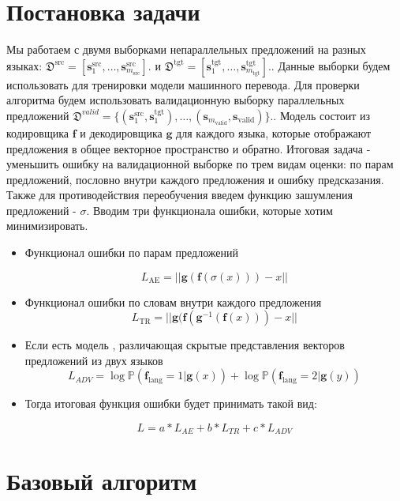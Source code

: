 \documentclass{article}
\begin{document}
\section{Постановка задачи}
Мы работаем с двумя выборками непараллельных предложений на разных языках: $\mathfrak{D}^{\text{src}} = [\mathbf{s}_1^{\text{src}},\dots,\mathbf{s}_{m_\text{src}}^{\text{src}}].$ и $\mathfrak{D}^{\text{tgt}} = [\mathbf{s}_1^{\text{tgt}}, \dots, \mathbf{s}_{m_\text{tgt}}^{\text{tgt}}].$. Данные выборки будем использовать для тренировки модели машинного перевода. Для проверки алгоритма будем использовать валидационную выборку параллельных предложений $\mathfrak{D}^{valid} = \{(\mathbf{s}_1^{\text{src}}, \mathbf{s}_1^{\text{tgt}}), \dots, (\mathbf{s}_{m_\text{valid}}, \mathbf{s}_\text{valid})\}.$. Модель состоит из кодировщика $\mathbf{f}$ и декодировщика $\mathbf{g}$ для каждого языка, которые отображают предложения в общее векторное пространство и обратно. 
\newline
Итоговая задача - уменьшить ошибку на валидационной выборке по трем видам оценки: по парам предложений, пословно внутри каждого предложения и ошибку предсказания. Также для противодействия переобучения введем функцию зашумления предложений - $\sigma$. Вводим три функционала ошибки, которые хотим минимизировать.

\begin{itemize}
 
  \item Функционал ошибки по парам предложений
  
  $$L_{\text{AE}} = ||\mathbf{g}(\mathbf{f}(\sigma(x)))-x||$$
  \item Функционал ошибки по словам внутри каждого предложения
  $$L_{\text{TR}} = ||\mathbf{g}(\mathbf{f}(\mathbf{g}^{-1}(\mathbf{f}(x))) - x||$$
  \item Если есть модель \D, различающая скрытые представления векторов предложений из двух языков
$$L_{ADV} = \log \mathbb{P}(\mathbf{f}_{\text{lang}} = 1| \mathbf{g}(x)) + \log \mathbb{P}(\mathbf{f}_{\text{lang}} = 2|\mathbf{g}(y))$$

  \item Тогда итоговая функция ошибки будет принимать такой вид:

$$L = a*L_{AE} + b*L_{TR} +  c*L_{ADV} $$
 \end{itemize}
 
 \section{Базовый алгоритм}
\end{document}
